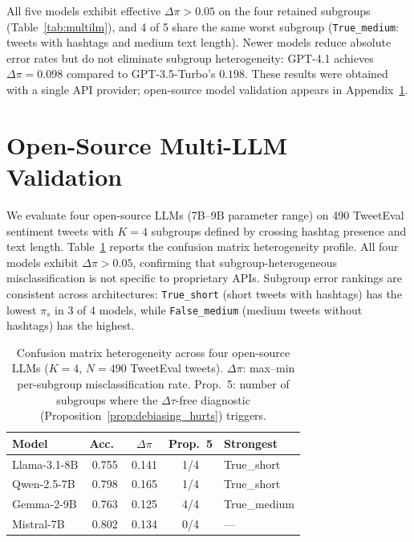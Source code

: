 All five models exhibit effective $\Delta\pi > 0.05$ on the four retained subgroups (Table~\ref{tab:multilm}), and 4 of 5 share the same worst subgroup (\texttt{True\_medium}: tweets with hashtags and medium text length).
Newer models reduce absolute error rates but do not eliminate subgroup heterogeneity: GPT-4.1 achieves $\Delta\pi = 0.098$ compared to GPT-3.5-Turbo's $0.198$.
These results were obtained with a single API provider; open-source model validation appears in Appendix~\ref{app:multilm_opensource}.

\section{Open-Source Multi-LLM Validation}
\label{app:multilm_opensource}

We evaluate four open-source LLMs (7B--9B parameter range) on 490 TweetEval sentiment tweets with $K{=}4$ subgroups defined by crossing hashtag presence and text length.
Table~\ref{tab:multilm_cm} reports the confusion matrix heterogeneity profile.
All four models exhibit $\Delta\pi > 0.05$, confirming that subgroup-heterogeneous misclassification is not specific to proprietary APIs.
Subgroup error rankings are consistent across architectures: \texttt{True\_short} (short tweets with hashtags) has the lowest $\pi_s$ in 3 of 4 models, while \texttt{False\_medium} (medium tweets without hashtags) has the highest.

\begin{table}[t]
\centering
\caption{Confusion matrix heterogeneity across four open-source LLMs ($K{=}4$, $N{=}490$ TweetEval tweets). $\Delta\pi$: max--min per-subgroup misclassification rate. Prop.~5: number of subgroups where the $\Delta\tau$-free diagnostic (Proposition~\ref{prop:debiasing_hurts}) triggers.}
\label{tab:multilm_cm}
\small
\begin{tabular}{lcccl}
\toprule
Model & Acc.\ & $\Delta\pi$ & Prop.~5 & Strongest \\
\midrule
Llama-3.1-8B & 0.755 & 0.141 & 1/4 & True\_short \\
Qwen-2.5-7B & 0.798 & 0.165 & 1/4 & True\_short \\
Gemma-2-9B & 0.763 & 0.125 & 4/4 & True\_medium \\
Mistral-7B & 0.802 & 0.134 & 0/4 & --- \\
\bottomrule
\end{tabular}
\end{table}

